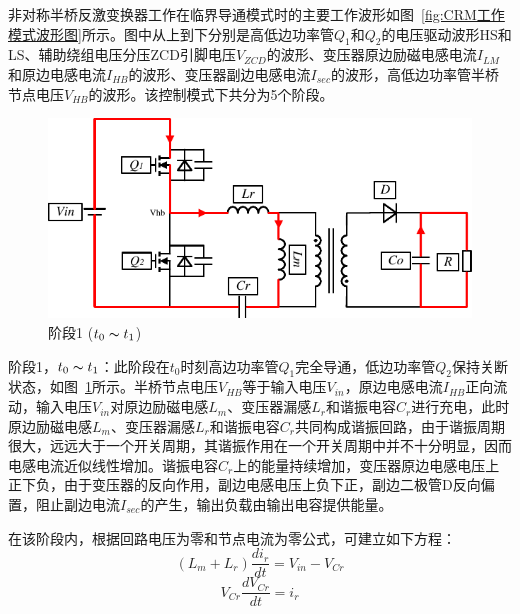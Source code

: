 非对称半桥反激变换器工作在临界导通模式时的主要工作波形如图~\ref{fig:CRM工作模式波形图}所示。图中从上到下分别是高低边功率管$Q_1$和$Q_2$的电压驱动波形HS和LS、辅助绕组电压分压ZCD引脚电压$V_{ZCD}$的波形、变压器原边励磁电感电流$I_{LM}$和原边电感电流$I_{HB}$的波形、变压器副边电感电流$I_{sec}$的波形，高低边功率管半桥节点电压$V_{HB}$的波形。该控制模式下共分为5个阶段。
						


\begin{figure}[htbp] 
    \centering
    \includegraphics[width=0.8\linewidth]{figures/工作原理1.pdf}
    \caption{阶段1 ($t_0 \thicksim t_1$)}
    \label{fig:工作原理1}
\end{figure}
                
阶段1，$t_0 \thicksim t_1$：此阶段在$t_0$时刻高边功率管$Q_1$完全导通，低边功率管$Q_2$保持关断状态，如图~\ref{fig:工作原理1}所示。半桥节点电压$V_{HB}$等于输入电压$V_{in}$，原边电感电流$I_{HB}$正向流动，输入电压$V_{in}$对原边励磁电感$L_m$、变压器漏感$L_r$和谐振电容$C_r$进行充电，此时原边励磁电感$L_m$、变压器漏感$L_r$和谐振电容$C_r$共同构成谐振回路，由于谐振周期很大，远远大于一个开关周期，其谐振作用在一个开关周期中并不十分明显，因而电感电流近似线性增加。谐振电容$C_r$上的能量持续增加，变压器原边电感电压上正下负，由于变压器的反向作用，副边电感电压上负下正，副边二极管D反向偏置，阻止副边电流$I_{sec}$的产生，输出负载由输出电容提供能量。

在该阶段内，根据回路电压为零和节点电流为零公式，可建立如下方程：
\begin{equation}
    \label{eq:回路电压公式}
    (L_m + L_r)\frac{di_r}{dt} = V_{in} - V_{Cr}  
\end{equation}
\begin{equation}
    \label{eq:结点电流公式}
    V_{Cr}\frac{dV_{Cr}}{dt} = i_r 
\end{equation}

